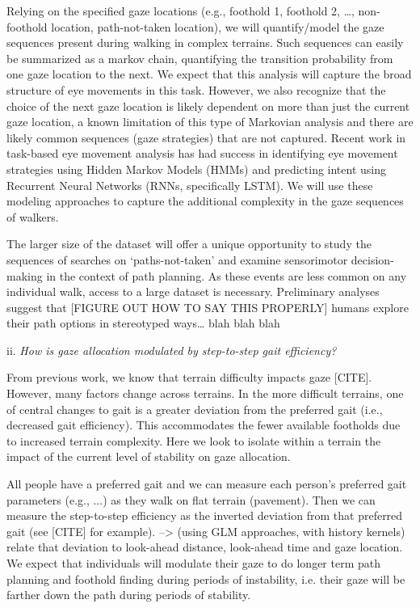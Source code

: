 Relying on the specified gaze locations (e.g., foothold 1, foothold 2, \ldots, non-foothold location, path-not-taken location), we will quantify/model the gaze sequences present during walking in complex terrains. Such sequences can easily be summarized as a markov chain, quantifying the transition probability from one gaze location to the next. We expect that this analysis will capture the broad structure of eye movements in this task. However, we also recognize that the choice of the next gaze location is likely dependent on more than just the current gaze location, a known limitation of this type of Markovian analysis and there are likely common sequences (gaze strategies) that are not captured. Recent work in task-based eye movement analysis has had success in identifying eye movement strategies using Hidden Markov Models (HMMs) and predicting intent using Recurrent Neural Networks (RNNs, specifically LSTM). We will use these modeling approaches to capture the additional complexity in the gaze sequences of walkers.

The larger size of the dataset will offer a unique opportunity to study the sequences of searches on `paths-not-taken' and examine sensorimotor decision-making in the context of path planning. As these events are less common on any individual walk, access to a large dataset is necessary. Preliminary analyses suggest that [FIGURE OUT HOW TO SAY THIS PROPERLY] humans explore their path options in stereotyped ways\ldots{} blah blah blah

ii. \emph{How is gaze allocation modulated by step-to-step gait
efficiency?}

From previous work, we know that terrain difficulty impacts gaze [CITE]. However, many factors change across terrains. In the more difficult terrains, one of central changes to gait is a greater deviation from the preferred gait (i.e., decreased gait efficiency). This accommodates the fewer available footholds due to increased terrain complexity. Here we look to isolate within a terrain the impact of the current level of stability on gaze allocation.

All people have a preferred gait and we can measure each person's preferred gait parameters (e.g., ...) as they walk on flat terrain (pavement). Then we can measure the step-to-step efficiency as the inverted deviation from that preferred gait (see [CITE] for example).  --> (using GLM approaches, with history kernels) relate that deviation to look-ahead distance, look-ahead time and gaze location. We expect that individuals will modulate their gaze to do longer term path planning and foothold finding during periods of instability, i.e. their gaze will be farther down the path during periods of stability.

